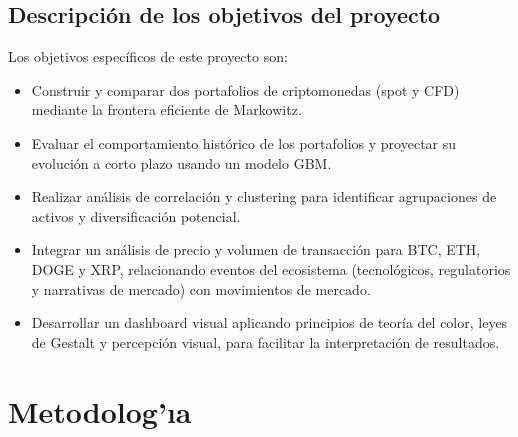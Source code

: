 \documentclass[12pt,letterpaper]{article}   %
\begin{document}
\subsection{Descripción de los objetivos del proyecto}
Los objetivos específicos de este proyecto son:
\begin{itemize}
\item Construir y comparar dos portafolios de criptomonedas (spot y CFD) mediante la frontera eficiente de Markowitz.
\item Evaluar el comportamiento histórico de los portafolios y proyectar su evolución a corto plazo usando un modelo GBM.
\item Realizar análisis de correlación y clustering para identificar agrupaciones de activos y diversificación potencial.
\item Integrar un análisis de precio y volumen de transacción para BTC, ETH, DOGE y XRP, relacionando eventos del ecosistema (tecnológicos, regulatorios y narrativas de mercado) con movimientos de mercado.
\item Desarrollar un dashboard visual aplicando principios de teoría del color, leyes de Gestalt y percepción visual, para facilitar la interpretación de resultados.
\end{itemize}

\section{Metodolog'{\i}a}
\end{document}
